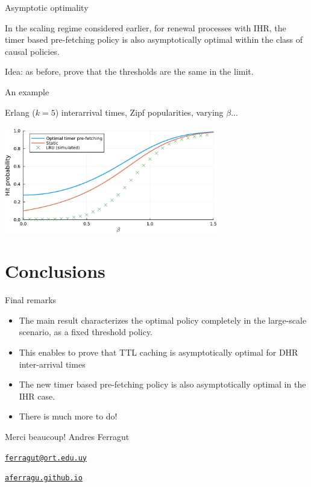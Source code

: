 \documentclass[aspectratio=169]{beamer}
\newenvironment*{myitem}[1][1.5em]{\begin{itemize}\setlength{\itemsep}{#1}}{\end{itemize}}
\begin{document}
\begin{frame}{Asymptotic optimality}

	\begin{theorem}

		In the scaling regime considered earlier, for renewal processes with IHR, the \alert{timer based pre-fetching policy} is also asymptotically optimal within the class of causal policies.
	\end{theorem}
	\vfill
	\alert{Idea:} as before, prove that the thresholds are the same in the limit.

\end{frame}

\begin{frame}{An example}
	
	Erlang ($k=5$) interarrival times, Zipf popularities, varying $\beta$...

	\vfill

\begin{center}
\includegraphics[width=0.7\textwidth]{figuras/comparison.pdf}
\end{center}

\vfill
\end{frame}
\section{Conclusions}

\begin{frame}{Final remarks}
	
	\begin{myitem}[2em]
		\item The main result characterizes the optimal policy completely in the large-scale scenario, as a fixed threshold policy.
		
		\item This enables to prove that \alert{TTL caching} is asymptotically optimal for DHR inter-arrival times
		
		\item The new \alert{timer based pre-fetching} policy is also asymptotically optimal in the IHR case. 
		
		\pause
		\item There is much more to do!
		
	\end{myitem}
\end{frame}


\begin{frame}[plain]
	\vfill
	{\Huge \alert{Merci beaucoup!}}
	\vfill
	Andres Ferragut

	\href{mailto://ferragut@ort.edu.uy}{\alert{\texttt{ferragut@ort.edu.uy}}}
	
	\href{http://aferragu.github.io}{\alert{\texttt{aferragu.github.io}}}
\end{frame}
\end{document}
